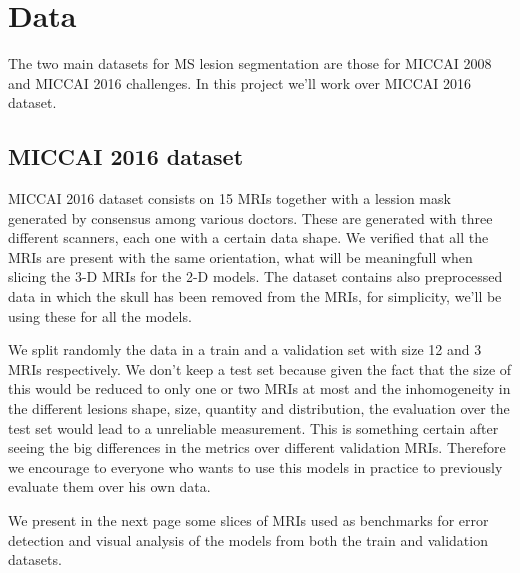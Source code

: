 \chapter{Data} 
\label{2.Data}




The two main datasets for MS lesion segmentation are those for MICCAI 2008 and MICCAI 2016 challenges. In this project we'll work over MICCAI 2016 dataset.

\section{MICCAI 2016 dataset}

MICCAI 2016 dataset consists on 15 MRIs together with a lession mask generated by consensus among various doctors. These are generated with three different scanners, each one with a certain data shape. We verified that all the MRIs are present with the same orientation, what will be meaningfull when slicing the 3-D MRIs for the 2-D models. The dataset contains also preprocessed data in which the skull has been removed from the MRIs, for simplicity, we'll be using these for all the models.

We split randomly the data in a train and a validation set with size 12 and 3 MRIs respectively. We don't keep a test set because given the fact that the size of this would be reduced to only one or two MRIs at most and the inhomogeneity in the different lesions shape, size, quantity and distribution, the evaluation over the test set would lead to a unreliable measurement. This is something certain after seeing the big differences in the metrics over different validation MRIs. Therefore we encourage to everyone who wants to use this models in practice to previously evaluate them over his own data.

We present in the next page some slices of MRIs used as benchmarks for error detection and visual analysis of the models from both the train and validation datasets.


